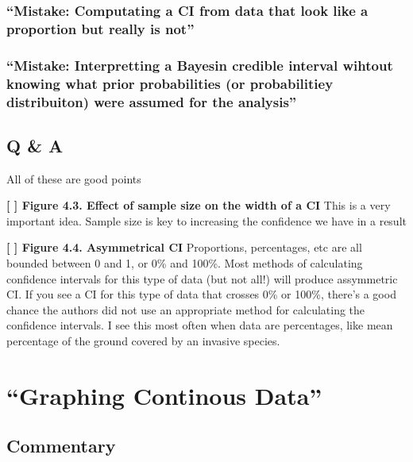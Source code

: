 \documentclass[]{book}
\theoremstyle{definition}
\theoremstyle{definition}
\theoremstyle{definition}
\theoremstyle{remark}
\begin{document}
\subsection{\texorpdfstring{``Mistake: Computating a CI from data that
look like a proportion but really is
not''}{Mistake: Computating a CI from data that look like a proportion but really is not}}\label{mistake-computating-a-ci-from-data-that-look-like-a-proportion-but-really-is-not}

\subsection{\texorpdfstring{``Mistake: Interpretting a Bayesin credible
interval wihtout knowing what prior probabilities (or probabilitiey
distribuiton) were assumed for the
analysis''}{Mistake: Interpretting a Bayesin credible interval wihtout knowing what prior probabilities (or probabilitiey distribuiton) were assumed for the analysis}}\label{mistake-interpretting-a-bayesin-credible-interval-wihtout-knowing-what-prior-probabilities-or-probabilitiey-distribuiton-were-assumed-for-the-analysis}

\section{Q \& A}\label{q-a}

All of these are good points

\textbf{{[} {]} Figure 4.3. Effect of sample size on the width of a CI}
This is a very important idea. Sample size is key to increasing the
confidence we have in a result

\textbf{{[} {]} Figure 4.4. Asymmetrical CI} Proportions, percentages,
etc are all bounded between 0 and 1, or 0\% and 100\%. Most methods of
calculating confidence intervals for this type of data (but not all!)
will produce assymmetric CI. If you see a CI for this type of data that
crosses 0\% or 100\%, there's a good chance the authors did not use an
appropriate method for calculating the confidence intervals. I see this
most often when data are percentages, like mean percentage of the ground
covered by an invasive species.

\chapter{\texorpdfstring{``Graphing Continous
Data''}{Graphing Continous Data}}\label{graphing-continous-data}

\section*{Commentary}\label{commentary-2}
\end{document}
